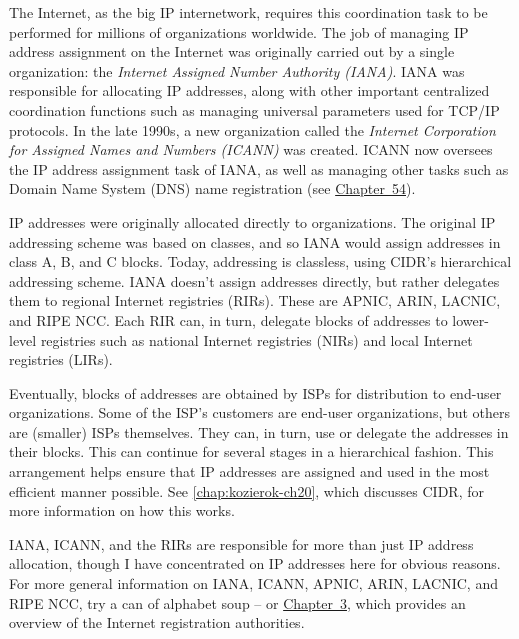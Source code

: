 The Internet, as the big IP internetwork, requires this coordination
task to be performed for millions of organizations worldwide. The job of
managing IP address assignment on the Internet was originally carried
out by a single organization: the {\emph{Internet Assigned Number
Authority (IANA)}}. IANA was responsible for allocating IP addresses,
along with other important centralized coordination functions such as
managing universal parameters used for TCP/IP protocols. In the late
1990s, a new organization called the {\emph{Internet Corporation for
Assigned Names and Numbers (ICANN)}} was created. ICANN now oversees the
IP address assignment task of IANA, as well as managing other tasks such
as Domain Name System (DNS) name registration (see
\protect\hyperlink{ch54.html}{Chapter~54}).

IP addresses were originally allocated directly to organizations. The
original IP addressing scheme was based on classes, and so IANA would
assign addresses in class A, B, and C blocks. Today, addressing is
classless, using CIDR's hierarchical addressing scheme. IANA doesn't
assign addresses directly, but rather delegates them to regional
Internet registries (RIRs). These are APNIC, ARIN, LACNIC, and RIPE NCC.
Each RIR can, in turn, delegate blocks of addresses to lower-level
registries such as national Internet registries (NIRs) and local
Internet registries (LIRs).

Eventually, blocks of addresses are obtained by ISPs for distribution to
end-user organizations. Some of the ISP's customers are end-user
organizations, but others are (smaller) ISPs themselves. They can, in
turn, use or delegate the addresses in their blocks. This can continue
for several stages in a hierarchical fashion. This arrangement helps
ensure that IP addresses are assigned and used in the most efficient
manner possible. See \vref{chap:kozierok-ch20}, which
discusses CIDR, for more information on how this works.

IANA, ICANN, and the RIRs are responsible for more than just IP address
allocation, though I have concentrated on IP addresses here for obvious
reasons. For more general information on IANA, ICANN, APNIC, ARIN,
LACNIC, and RIPE NCC, try a can of alphabet soup -- or \protect\hyperlink{ch03.html}{Chapter~3}, which provides an overview of the Internet registration authorities.

